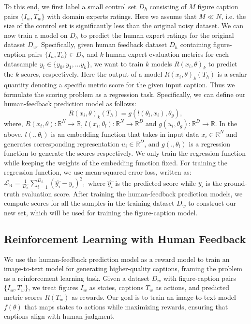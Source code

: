 \documentclass[11pt]{article}
\begin{document}
To this end, we first label a small control set $D_h$ consisting of $M$ figure caption pairs $\{ I_w, T_w \}$ with domain experts ratings. Here we assume that $M \ll N$, i.e. the size of the control set is significantly less than the original noisy dataset. We can now train a model on $D_h$ to predict the human expert ratings for the original dataset $D_w$. 
Specifically, given human feedback dataset $D_h$ containing figure-caption pairs $\{ I_h, T_h \} \in D_h$ and $k$ human expert evaluation metrics for each datasample $y_i \in \{y_0, y_1, ...y_k\}$, we want to train $k$ models $R(x_i, \theta)_k$ to predict the $k$ scores, respectively. Here the output of a model $R(x_i, \theta)_k(T_h)$ is a scalar quantity denoting a specific metric score for the given input caption. Thus we formulate the scoring problem as a regression task.
Specifically, we can define our human-feedback prediction model as follows:
\begin{equation}\label{obj:reward}
    R(x_i, \theta)_k(T_h) = g(l(\theta_l, x_i), \theta_g),  
\end{equation}
where, $R(x_i, \theta): \mathbb{R}^N \rightarrow \mathbb{R}$,  $l(x_i, \theta_l): \mathbb{R}^N \rightarrow \mathbb{R}^D$ and $g(u_i, \theta_g): \mathbb{R}^D \rightarrow \mathbb{R} $. In the above, $l(., \theta_l)$ is an embedding function that takes in input data $x_i \in \mathbb{R}^N$ and generates corresponding representation $u_i \in \mathbb{R}^D $, and $g(., \theta_l)$ is a regression function to generate the scores respectively. We only train the regression function while keeping the weights of the embedding function fixed. For training the regression function, we use mean-squared error loss, written as: $  \mathcal{L}_\text{R} = \frac{1}{D_{h}}\sum_{i=1}^{D_h}(\hat{y_i} -y_i)^2,$ where $\hat{y_i}$ is the predicted score while $y_i$ is the ground-truth evaluation score. 
After training the human-feedback prediction models, we compute scores for all the samples in the training dataset $D_w$ to construct our new set, which will be used for training the figure-caption model.

\subsection{Reinforcement Learning with Human Feedback}\label{rlhf}

We use the human-feedback prediction model as a reward model to train an image-to-text model for generating higher-quality captions, framing the problem as a reinforcement learning task. Given a dataset $D_w$ with figure-caption pairs $\{ I_w, T_w \}$, we treat figures $I_w$ as states, captions $T_w$ as actions, and predicted metric scores $R(T_w)$ as rewards. Our goal is to train an image-to-text model $f(\theta)$ that maps states to actions while maximizing rewards, ensuring that captions align with human judgment.
\end{document}
